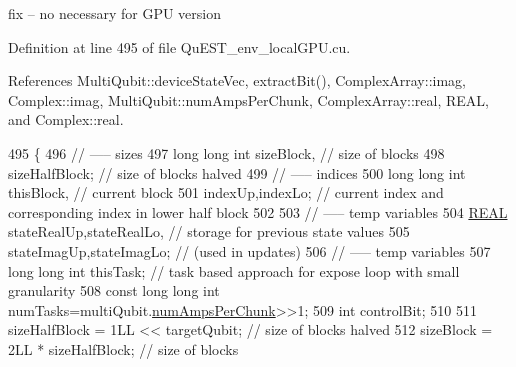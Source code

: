 fix -- no necessary for G\+PU version 

Definition at line 495 of file Qu\+E\+S\+T\+\_\+env\+\_\+local\+G\+P\+U.\+cu.



References Multi\+Qubit\+::device\+State\+Vec, extract\+Bit(), Complex\+Array\+::imag, Complex\+::imag, Multi\+Qubit\+::num\+Amps\+Per\+Chunk, Complex\+Array\+::real, R\+E\+AL, and Complex\+::real.


\begin{DoxyCode}
495                                                                                                            
                                             \{
496     \textcolor{comment}{// ----- sizes}
497     \textcolor{keywordtype}{long} \textcolor{keywordtype}{long} \textcolor{keywordtype}{int} sizeBlock,                                           \textcolor{comment}{// size of blocks}
498          sizeHalfBlock;                                       \textcolor{comment}{// size of blocks halved}
499     \textcolor{comment}{// ----- indices}
500     \textcolor{keywordtype}{long} \textcolor{keywordtype}{long} \textcolor{keywordtype}{int} thisBlock,                                           \textcolor{comment}{// current block}
501          indexUp,indexLo;                                     \textcolor{comment}{// current index and corresponding index in
       lower half block}
502 
503     \textcolor{comment}{// ----- temp variables}
504     \mbox{\hyperlink{QuEST__precision_8h_a4b654506f18b8bfd61ad2a29a7e38c25}{REAL}}   stateRealUp,stateRealLo,                             \textcolor{comment}{// storage for previous state values}
505            stateImagUp,stateImagLo;                             \textcolor{comment}{// (used in updates)}
506     \textcolor{comment}{// ----- temp variables}
507     \textcolor{keywordtype}{long} \textcolor{keywordtype}{long} \textcolor{keywordtype}{int} thisTask;                                   \textcolor{comment}{// task based approach for expose loop with
       small granularity}
508     \textcolor{keyword}{const} \textcolor{keywordtype}{long} \textcolor{keywordtype}{long} \textcolor{keywordtype}{int} numTasks=multiQubit.\mbox{\hyperlink{structMultiQubit_a1cad83601a78635dd278259c7ed54f18}{numAmpsPerChunk}}>>1;
509     \textcolor{keywordtype}{int} controlBit;
510 
511     sizeHalfBlock = 1LL << targetQubit;                               \textcolor{comment}{// size of blocks halved}
512     sizeBlock     = 2LL * sizeHalfBlock;                           \textcolor{comment}{// size of blocks}

\end{DoxyCode}
